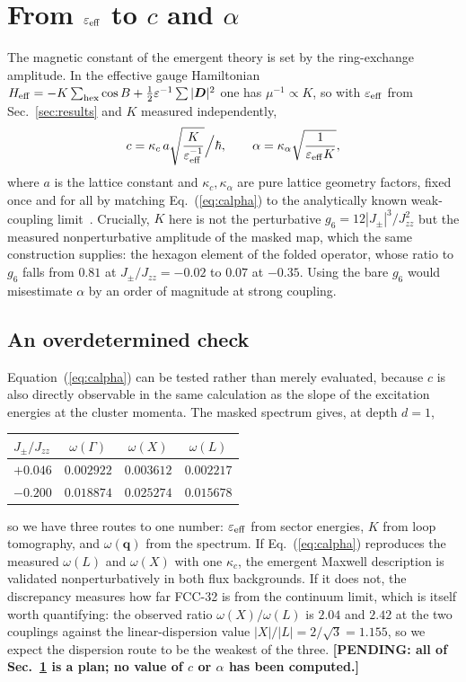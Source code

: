 \documentclass[aps,prb,preprint,amsmath,amssymb,superscriptaddress,
longbibliography,floatfix]{revtex4-2}
\newcommand{\Jzz}{J_{zz}}
\newcommand{\Jpm}{J_{\pm}}
\DeclareRobustCommand{\bq}{\bm q}
\newcommand{\pending}[1]{{\color{red}\textbf{[PENDING: #1]}}}
\begin{document}
\section{From $\varepsilon_{\rm eff}$ to $c$ and $\alpha$}
\label{sec:alpha}

The magnetic constant of the emergent theory is set by the ring-exchange
amplitude.  In the effective gauge Hamiltonian
$H_{\rm eff}=-K\sum_{\rm hex}\cos B+\tfrac12\varepsilon^{-1}\sum|\bm D|^2$ one
has $\mu^{-1}\propto K$, so with $\varepsilon_{\rm eff}$ from
Sec.~\ref{sec:results} and $K$ measured independently,
\begin{equation}
 c=\kappa_c\,a\sqrt{\frac{K}{\varepsilon_{\rm eff}^{-1}}}\Big/\hbar,
 \qquad
 \alpha=\kappa_\alpha\sqrt{\frac{1}{\varepsilon_{\rm eff}K}} ,
 \label{eq:calpha}
\end{equation}
where $a$ is the lattice constant and $\kappa_c,\kappa_\alpha$ are pure lattice
geometry factors, fixed once and for all by matching Eq.~(\ref{eq:calpha}) to
the analytically known weak-coupling limit~\cite{Hermele2004}.  Crucially, $K$
here is not the perturbative $g_6=12|\Jpm|^3/\Jzz^2$ but the measured
nonperturbative amplitude of the masked map, which the same construction
supplies: the hexagon element of the folded operator, whose ratio to $g_6$
falls from $0.81$ at $\Jpm/\Jzz=-0.02$ to $0.07$ at $-0.35$.  Using the bare
$g_6$ would misestimate $\alpha$ by an order of magnitude at strong coupling.

\subsection{An overdetermined check}

Equation~(\ref{eq:calpha}) can be tested rather than merely evaluated, because
$c$ is also directly observable in the same calculation as the slope of the
excitation energies at the cluster momenta.  The masked spectrum gives, at
depth $d=1$,
\begin{center}
\begin{tabular}{lccc}
$\Jpm/\Jzz$ & $\omega(\Gamma)$ & $\omega(X)$ & $\omega(L)$\\ \hline
$+0.046$ & $0.002922$ & $0.003612$ & $0.002217$\\
$-0.200$ & $0.018874$ & $0.025274$ & $0.015678$\\
\end{tabular}
\end{center}
so we have three routes to one number: $\varepsilon_{\rm eff}$ from sector
energies, $K$ from loop tomography, and $\omega(\bq)$ from the spectrum.  If
Eq.~(\ref{eq:calpha}) reproduces the measured $\omega(L)$ and $\omega(X)$ with
one $\kappa_c$, the emergent Maxwell description is validated nonperturbatively
in both flux backgrounds.  If it does not, the discrepancy measures how far
FCC-32 is from the continuum limit, which is itself worth quantifying: the
observed ratio $\omega(X)/\omega(L)$ is $2.04$ and $2.42$ at the two couplings
against the linear-dispersion value $|X|/|L|=2/\sqrt3=1.155$, so we expect the
dispersion route to be the weakest of the three.  \pending{all of
Sec.~\ref{sec:alpha} is a plan; no value of $c$ or $\alpha$ has been computed.}
\end{document}

